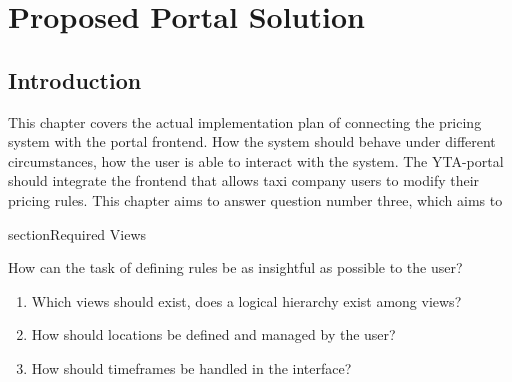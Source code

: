 \graphicspath{{Chapter4/Figs/Vector/}{Chapter4/Figs/}}

%
\chapter{Proposed Portal Solution}

%
\section{Introduction}
This chapter covers the actual implementation plan of connecting the pricing system with the portal frontend. How the system should behave under different circumstances, how the user is able to interact with the system. The YTA-portal should integrate the frontend that allows taxi company users to modify their pricing rules. This chapter aims to answer question number three, which aims to

%
section{Required Views}


How can the task of defining rules be as insightful as possible to the user?
\begin{enumerate}
    \item Which views should exist, does a logical hierarchy exist among views?
    \item How should locations be defined and managed by the user?
    \item How should timeframes be handled in the interface?
\end{enumerate}

